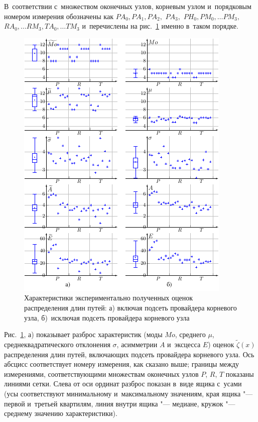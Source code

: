 \documentclass[10pt, a5paper]{article}
\begin{document}
В~соответствии с~множеством оконечных узлов, корневым узлом и~порядковым номером измерения
обозначены как $PA_0, PA_1, PA_2,$ $PA_3,$ $PH_0, PM_0, \ldots PM_3,$ $RA_0, \ldots RM_3, TA_0, \ldots TM_3$
и~перечислены на рис.~\ref{5x2_experiment_moments} именно в~таком порядке.

\begin{figure}[p]
  \centering
  \includegraphics[width=\linewidth]{2019_miet_kai_gav_5x2_experiment_moments}
\caption{Характеристики экспериментально полученных оценок распределения длин путей:
а) включая подсеть провайдера корневого узла,
б)~исключая подсеть провайдера корневого узла
}
\label{5x2_experiment_moments}
\end{figure}

Рис.~\ref{5x2_experiment_moments}, а) показывает разброс характеристик (моды $Mo$, среднего $\mu$, среднеквадратического отклонения $\sigma$, асимметрии $A$ и~эксцесса $E$) оценок $\widetilde{\zeta}(x)$ распределения длин путей, включающих подсеть провайдера корневого узла.
Ось абсцисс соответствует номеру измерения, как сказано выше; 
границы между измерениями, соответствующими множествам оконечных узлов $P$, $R$, $T$  показаны линиями сетки.
% 
Слева от оси ординат разброс показан в~виде ящика с~усами (усы соответствуют минимальному и~максимальному значениям, края ящика "--- первой и~третьей квартилям, линия внутри ящика "--- медиане, кружок "--- среднему значению характеристики).
 
\end{document}
